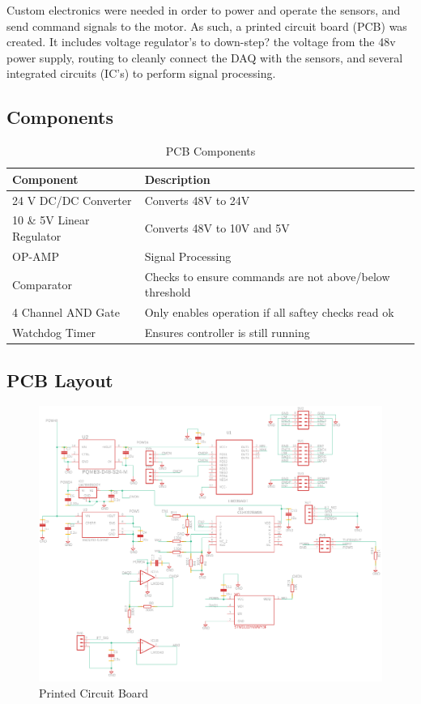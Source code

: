 \documentclass[12pt]{report}
\begin{document}
	Custom electronics were needed in order to power and operate the sensors, and send command signals to the motor. As such, a printed circuit board (PCB) was created. It includes voltage regulator's to down-step? the voltage from the 48v power supply, routing to cleanly connect the DAQ with the sensors, and several integrated circuits (IC's) to perform signal processing. 
	
	
	
		\subsection{Components}
		
	\begin{table}[]
	\centering
	\caption{PCB Components}	
	\begin{tabular}{|l|l|}
		\hline
		\textbf{Component} & \textbf{Description}  \\ \hline
		24 V DC/DC Converter & Converts 48V to 24V  \\ \hline
		10 \& 5V Linear Regulator & Converts 48V to 10V and 5V  \\ \hline
		OP-AMP & Signal Processing   \\ \hline
		Comparator & Checks to ensure commands are not above/below threshold   \\ \hline
		4 Channel AND Gate & Only enables operation if all saftey checks read ok   \\ \hline
		Watchdog Timer & Ensures controller is still running \\ \hline

		\end{tabular}
	\label{tab:belt}
	\end{table}
		
		\subsection{PCB Layout}
		
	\begin{figure}[t] 
		\centering
		\includegraphics[width=0.9\linewidth]{pcb_schematic}
		\caption{Printed Circuit Board}
		\label{fig:pcb}
	\end{figure}
	
\end{document}
